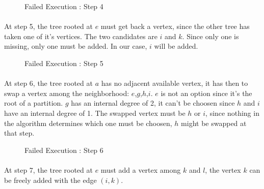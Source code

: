 \begin{figure}[H]
  \caption{Failed Execution : Step 4}
  \begin{center}
    \begin{tikzpicture}[scale=0.9,transform shape]
      
    \end{tikzpicture}
  \end{center}
\end{figure}

\paragraph{}
At step 5, the tree rooted at $e$ must get back a vertex, since the other tree
has taken one of it's vertices. The two candidates are $i$ and $k$. Since only
one is missing, only one must be added. In our case, $i$ will be added.

\begin{figure}[H]
  \caption{Failed Execution : Step 5}
  \begin{center}
    \begin{tikzpicture}[scale=0.9,transform shape]
      
    \end{tikzpicture}
  \end{center}
\end{figure}

\paragraph{}
At step 6, the tree rooted at $a$ has no adjacent available vertex, it has
then to swap a vertex among the neighborhood: $e$,$g$,$h$,$i$. $e$ is not an
option since it's the root of a partition. $g$ has an internal degree of 2, it
can't be choosen since $h$ and $i$ have an internal degree of 1. The swapped
vertex must be $h$ or $i$, since nothing in the algorithm determines which one
must be choosen, $h$ might be swapped at that step.

\begin{figure}[H]
  \caption{Failed Execution : Step 6}
  \begin{center}
    \begin{tikzpicture}[scale=0.9,transform shape]
      
    \end{tikzpicture}
  \end{center}
\end{figure}

\paragraph{}
At step 7, the tree rooted at $e$ must add a vertex among $k$ and $l$, the
vertex $k$ can be freely added with the edge $(i,k)$.

